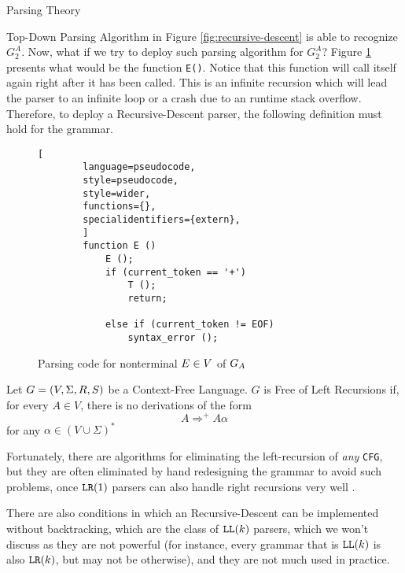 \begin{section}{Parsing Theory}
\begin{subsection}{Top-Down Parsing}
Algorithm in Figure \ref{fig:recursive-descent} is able to recognize
$G_2^A$. Now, what if we try to deploy such parsing algorithm for
$G_2^A$? Figure \ref{fig:recursive_descent_2} presents what would be
the function \texttt{E()}. Notice that this function will call
itself again right after
it has been called. This is an infinite recursion which will lead the
parser to an infinite loop or a crash due to an
runtime stack overflow. Therefore, to deploy a Recursive-Descent parser,
the following definition must hold for the grammar.

\begin{figure}[ht]
	\centering
	\begin{lstlisting}[
		language=pseudocode,
		style=pseudocode,
		style=wider,
		functions={},
		specialidentifiers={extern},
		]
		function E ()
			E ();
			if (current_token == '+')
				T ();
				return;
			
			else if (current_token != EOF)
				syntax_error ();
	\end{lstlisting}
\caption{Parsing code for nonterminal $\protect E \in V$ of $\protect G_A$ }
\label{fig:recursive_descent_2}
\end{figure}

\begin{definition}
	Let $G = (V, \Sigma, R, S)$ be a Context-Free Language. $G$ is Free of
	Left Recursions if, for every $A \in V$, there is no derivations
	of the form
	$$ A \Rightarrow^+ A \alpha$$
	for any $\alpha \in (V \cup \Sigma)^*$
\end{definition}

Fortunately, there are algorithms for eliminating the left-recursion of
\textit{any} \texttt{CFG}, but they are often eliminated by hand redesigning
the grammar to avoid such problems, once $\texttt{LR}(1)$ parsers can also handle
right recursions very well \citep{dragonbook}.

There are also conditions in which an Recursive-Descent can be implemented
without backtracking, which are the class of $\texttt{LL}(k)$ parsers,
which we won't discuss as they are not powerful (for instance, every
grammar that is $\texttt{LL}(k)$ is also $\texttt{LR}(k)$, but may not be otherwise),
and they are not much used in practice.

\end{subsection}
\end{section}

